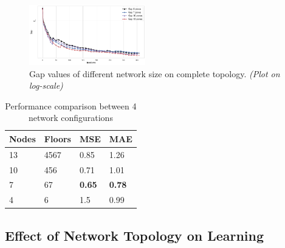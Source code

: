 \begin{figure}
    \centering
    \includegraphics[width=0.45\textwidth]{./img/gap4.png}
    \caption{Gap values of different network size on complete topology.
    \textit{(Plot on log-scale)}}
    \label{fig:gap-multiple-size}
\end{figure}



\begin{table}[]
\centering
\begin{tabular}{|l|l|l|l|}
\hline
Nodes & Floors   & MSE & MAE    \\ \hline
13 & 4567   & 0.85 & 1.26  \\ \hline
10 & 456 	& 0.71 & 1.01 \\ \hline
7 & 67     & \textbf{0.65} &	\textbf{0.78} \\ \hline 
4 & 6    &	1.5 &	0.99\\ \hline
\end{tabular}
\caption{Performance comparison between 4 network configurations  }
\label{table:temp4comp}
\end{table}





\subsection{Effect of Network Topology on Learning}


